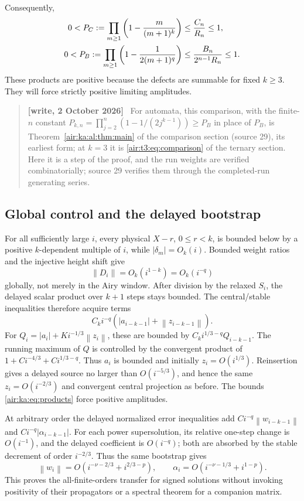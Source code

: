 \documentclass[11pt,letterpaper]{article}
\numberwithin{equation}{section}
\theoremstyle{remark}
\newcommand{\norm}[1]{\left\lVert#1\right\rVert}
\newenvironment{writenote}{\par\smallskip\begin{quote}\small\textbf{[write, 2 October 2026]}\ }{\end{quote}\smallskip}
\begin{document}
Consequently,
\begin{align}\label{air:ka:eq:products}
 0<P_C:=\prod_{m\ge1}\left(1-\frac{m}{(m+1)^k}\right)
 &\le\frac{C_n}{R_n}\le1,\\
 0<P_B:=\prod_{m\ge1}\left(1-\frac{1}{2(m+1)^q}\right)
 &\le\frac{B_n}{2^{n-1}R_n}\le1.\notag
\end{align}
These products are positive because the defects are summable for fixed $k\ge3$. They will force strictly positive limiting amplitudes.
\begin{writenote}
For automata, this comparison, with the finite-$n$ constant $P_{k,n}=\prod_{j=2}^n(1-1/(2j^{k-1}))\ge P_B$ in place of $P_B$, is Theorem~\ref{air:ka:al:thm:main} of the comparison section (source 29), its earliest form; at $k=3$ it is \eqref{air:t3:eq:comparison} of the ternary section. Here it is a step of the proof, and the run weights are verified combinatorially; source 29 verifies them through the completed-run generating series.
\end{writenote}


\subsection{Global control and the delayed bootstrap}\label{air:ka:subsec:global}
For all sufficiently large $i$, every physical $X-r$, $0\le r<k$, is bounded below by a positive $k$-dependent multiple of $i$, while $|\delta_m|=O_k(i)$. Bounded weight ratios and the injective height shift give
\[
 \norm{D_i}=O_k(i^{1-k})=O_k(i^{-q})
\]
globally, not merely in the Airy window. After division by the relaxed $S_i$, the delayed scalar product over $k+1$ steps stays bounded. The central/stable inequalities therefore acquire terms
\[
 C_ki^{-q}(|a_{i-k-1}|+\norm{z_{i-k-1}}).
\]
For $Q_i=|a_i|+Ki^{-1/3}\norm{z_i}$, these are bounded by
$C_ki^{1/3-q}Q_{i-k-1}$. The running maximum of $Q$ is controlled by the convergent product of $1+Ci^{-4/3}+Ci^{1/3-q}$. Thus $a_i$ is bounded and initially $z_i=O(i^{1/3})$. Reinsertion gives a delayed source no larger than $O(i^{-5/3})$, and hence the same $z_i=O(i^{-2/3})$ and convergent central projection as before. The bounds \eqref{air:ka:eq:products} force positive amplitudes.

At arbitrary order the delayed normalized error inequalities add $Ci^{-q}\norm{w_{i-k-1}}$ and $Ci^{-q}|\alpha_{i-k-1}|$. For each power supersolution, its relative one-step change is $O(i^{-1})$, and the delayed coefficient is $O(i^{-q})$; both are absorbed by the stable decrement of order $i^{-2/3}$. Thus the same bootstrap gives
\[
 \norm{w_i}=O(i^{-\nu-2/3}+i^{2/3-p}),\qquad
 \alpha_i=O(i^{-\nu-1/3}+i^{1-p}).
\]
This proves the all-finite-orders transfer for signed solutions without invoking positivity of their propagators or a spectral theorem for a companion matrix.
\end{document}
